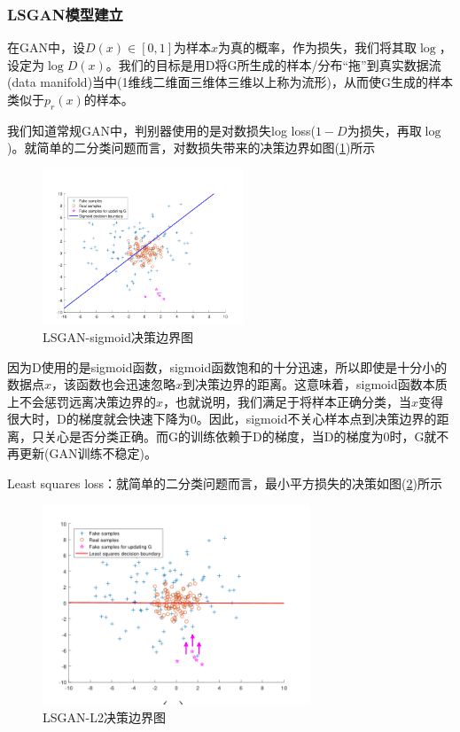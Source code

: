         \subsubsection{LSGAN模型建立}
            \par
            在GAN中，设$D(x)\in [0,1]$为样本$x$为真的概率，作为损失，我们将其取$\log$，设定为$\log D(x)$。我们的目标是用D将G所生成的样本/分布“拖”到真实数据流(data manifold)当中(1维线二维面三维体三维以上称为流形)，从而使G生成的样本类似于$p_r(x)$的样本。
            \par
            我们知道常规GAN中，判别器使用的是对数损失log loss($1-D$为损失，再取$\log$)。就简单的二分类问题而言，对数损失带来的决策边界如图(\ref{fig:LSGAN-sigmoid决策边界图})所示
                \begin{figure}[H]
                \centering
                \includegraphics[width=6cm]{images/LSGAN-sigmoid.jpg}
                \caption{LSGAN-sigmoid决策边界图}
                \label{fig:LSGAN-sigmoid决策边界图}
                \end{figure}
            因为D使用的是sigmoid函数，sigmoid函数饱和的十分迅速，所以即使是十分小的数据点$x$，该函数也会迅速忽略$x$到决策边界的距离。这意味着，sigmoid函数本质上不会惩罚远离决策边界的$x$，也就说明，我们满足于将样本正确分类，当$x$变得很大时，D的梯度就会快速下降为0。因此，sigmoid不关心样本点到决策边界的距离，只关心是否分类正确。而G的训练依赖于D的梯度，当D的梯度为0时，G就不再更新(GAN训练不稳定)。
            \par
            Least squares loss：就简单的二分类问题而言，最小平方损失的决策如图(\ref{fig:LSGAN-L2决策边界图})所示
                \begin{figure}[H]
                \centering
                \includegraphics[width=8cm]{images/LSGAN-L2decision.jpg}
                \caption{LSGAN-L2决策边界图}
                \label{fig:LSGAN-L2决策边界图}
                \end{figure}
